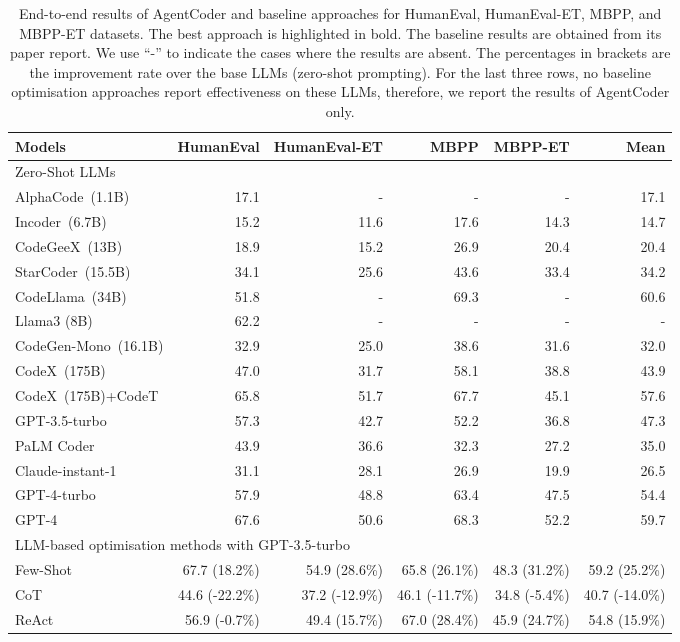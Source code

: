 \documentclass{article}
\newcommand{\xxx}{AgentCoder\xspace}
\begin{document}
\begin{table}\scriptsize
    \centering
    \caption{End-to-end results of \xxx and baseline approaches for HumanEval, HumanEval-ET, MBPP, and MBPP-ET datasets. The best approach is highlighted in bold. The baseline results are obtained from its paper report. 
    We use ``-'' to indicate the cases where the results are absent. The percentages in brackets are the improvement rate over the base LLMs (zero-shot prompting). For the last three rows, no baseline optimisation approaches report effectiveness on these LLMs, therefore, we report the results of \xxx only. }
    \begin{tabular}{lrrrrr}
    \toprule
    Models&\textbf{HumanEval}&\textbf{HumanEval-ET}&\textbf{MBPP}&\textbf{MBPP-ET}&\textbf{Mean}\\
    \midrule
    \multicolumn{6}{l}{Zero-Shot LLMs}\\
    \midrule
    AlphaCode~(1.1B)&17.1&-&-&-&17.1  \\
    Incoder~(6.7B)&15.2&11.6&17.6&14.3&14.7 \\
    CodeGeeX~(13B)&18.9&15.2&26.9&20.4&20.4\\
    StarCoder~(15.5B)&34.1&25.6&43.6&33.4&34.2\\
    CodeLlama~(34B)&51.8&-&69.3&-&60.6\\
    Llama3 (8B)&62.2&-&-&-&-\\
    CodeGen-Mono~(16.1B)&32.9&25.0&38.6&31.6&32.0\\
    CodeX~(175B)&47.0&31.7&58.1&38.8&43.9\\
    CodeX~(175B)+CodeT&65.8&51.7&67.7&45.1&57.6\\
    GPT-3.5-turbo&57.3&42.7&52.2&36.8&47.3\\
    PaLM Coder&43.9&36.6&32.3&27.2&35.0\\
    Claude-instant-1&31.1&28.1&26.9&19.9&26.5\\
    GPT-4-turbo&57.9&48.8&63.4&47.5&54.4\\
    GPT-4&67.6&50.6&68.3&52.2&59.7\\
     \midrule
     \multicolumn{6}{l}{LLM-based optimisation methods with GPT-3.5-turbo}\\
     \midrule
Few-Shot& 67.7 (18.2\%)&54.9 (28.6\%)&65.8 (26.1\%)&48.3 (31.2\%)&59.2 (25.2\%)\\
CoT& 44.6 (-22.2\%)&37.2 (-12.9\%)&46.1 (-11.7\%)&34.8 (-5.4\%)&40.7 (-14.0\%)\\
ReAct& 56.9 (-0.7\%)&49.4 (15.7\%)&67.0 (28.4\%)&45.9 (24.7\%)&54.8 (15.9\%)\\

\end{tabular}
\end{table}
\end{document}
